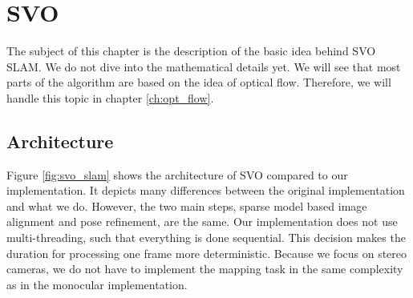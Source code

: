 \documentclass[11pt,a4paper,titlepage,oneside]{report}
\begin{document}
\chapter{SVO}\label{ch:svo}
The subject of this chapter is the description of the basic idea behind SVO SLAM. We do not dive into the mathematical details yet. We will see that most parts of the algorithm are based on the idea of optical flow. Therefore, we will handle this topic in chapter \ref{ch:opt_flow}.

\section{Architecture}

Figure \ref{fig:svo_slam} shows the architecture of SVO compared to our implementation. It depicts many differences between the original implementation and what we do. However, the two main steps, sparse model based image alignment and pose refinement, are the same. Our implementation does not use multi-threading, such that everything is done sequential. This decision makes the duration for processing one frame more deterministic. Because we focus on stereo cameras, we do not have to implement the mapping task in the same complexity as in the monocular implementation.
\end{document}
